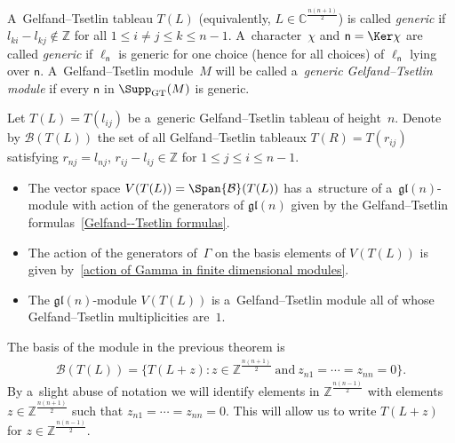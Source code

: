 \begin{Definition}
\label{def-gen}
A~Gelfand--Tsetlin tableau $T(L)$ \big(equivalently, $L\in{\mathbb C}^{\frac{n(n+1)}{2}}$\big) is called \emph{generic} if
$l_{ki}-l_{kj}\notin\mathbb{Z}$ for all $1\leq i\neq j \leq k \leq n-1$.
A~character~$\chi$ and $\mathsf n = \Ker \chi$ are called \emph{generic} if $\ell_{\mathsf n}$ is generic for one choice
(hence for all choices) of $\ell_{\mathsf n}$ lying over $\mathsf n$.
A~Gelfand--Tsetlin module~$M$ will be called a~\emph{generic Gelfand--Tsetlin module} if every $\mathsf n$ in
$\Supp_{\rm GT}(M)$ is generic.
\end{Definition}

\begin{Theorem}%
Let $T(L) = T(l_{ij})$ be a~generic Gelfand--Tsetlin tableau of height~$n$.
Denote by ${\mathcal B}(T(L))$ the set of all Gelfand--Tsetlin tableaux $T(R) = T(r_{ij})$ satisfying $r_{nj}=l_{nj}$,
$r_{ij}-l_{ij}\in\mathbb{Z}$ for
$1\leq j\leq i \leq n-1$.
\begin{itemize}\itemsep=0pt
\item[$(i)$] The vector space $V(T(L)) = \Span {\mathcal B}(T(L))$ has a~structure of a~$\mathfrak{gl}(n)$-module with
action of the generators of $\mathfrak{gl}(n)$ given by the Gelfand--Tsetlin formulas~\eqref{Gelfand--Tsetlin formulas}.
\item[$(ii)$] The action of the generators of~$\Gamma$ on the basis elements of $V(T(L))$ is given by~\eqref{action of Gamma in finite dimensional modules}.
\item[$(iii)$] The $\mathfrak{gl}(n)$-module $V(T(L))$ is a~Gelfand--Tsetlin module all of whose Gelfand--Tsetlin
multiplicities are~$1$.
\end{itemize}
\end{Theorem}

\begin{Remark}

The basis of the module in the previous theorem is
\begin{gather*}
{\mathcal B}(T(L)) = \big\{T(L+z):z\in\mathbb{Z}^{\frac{n(n+1)}{2}}~\text{and}~z_{n1}=\cdots=z_{nn}=0\big\}.
\end{gather*}
By a~slight abuse of notation we will identify elements in $\mathbb{Z}^{\frac{n(n-1)}{2}}$ with elements
$z\in\mathbb{Z}^{\frac{n(n+1)}{2}}$ such that $z_{n1}=\cdots=z_{nn}=0$.
This will allow us to write $T(L+z)$ for $z\in\mathbb{Z}^{\frac{n(n-1)}{2}}$.
\end{Remark}

